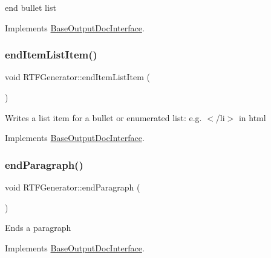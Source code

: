 end bullet list 

Implements \mbox{\hyperlink{class_base_output_doc_interface_a3493b65672bf134033bd3bb296acdff4}{Base\+Output\+Doc\+Interface}}.

\mbox{\label{class_r_t_f_generator_a4d3cc3baac4adda9ef5da4c9e470871b}} 
\subsubsection{\texorpdfstring{endItemListItem()}{endItemListItem()}}
{\footnotesize\ttfamily void R\+T\+F\+Generator\+::end\+Item\+List\+Item (\begin{DoxyParamCaption}{ }\end{DoxyParamCaption})\hspace{0.3cm}{\ttfamily [virtual]}}

Writes a list item for a bullet or enumerated list\+: e.\+g. {\ttfamily $<$/li$>$} in html 

Implements \mbox{\hyperlink{class_base_output_doc_interface_a90d290d7a06a9e7ecd968c8da90ed665}{Base\+Output\+Doc\+Interface}}.

\mbox{\label{class_r_t_f_generator_aefcb5d16655eae184dcacecfd27c0068}} 
\subsubsection{\texorpdfstring{endParagraph()}{endParagraph()}}
{\footnotesize\ttfamily void R\+T\+F\+Generator\+::end\+Paragraph (\begin{DoxyParamCaption}{ }\end{DoxyParamCaption})\hspace{0.3cm}{\ttfamily [virtual]}}

Ends a paragraph 

Implements \mbox{\hyperlink{class_base_output_doc_interface_ab76280c2eb451ad160991707206b6c95}{Base\+Output\+Doc\+Interface}}.

\mbox{\label{class_r_t_f_generator_af9e17986de22ddd0b3a4afe4449b4a2c}} 
